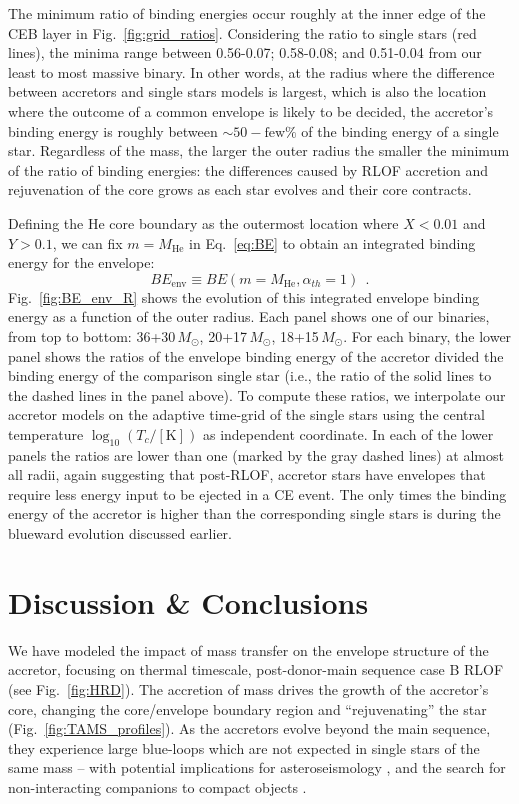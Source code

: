 \documentclass[twocolumn,twocolappendix,trackchanges]{aastex63}
\DeclareRobustCommand{\Eqref}[1]{Eq.~\ref{#1}}
\DeclareRobustCommand{\Figref}[1]{Fig.~\ref{#1}}
\begin{document}
The minimum ratio of binding energies occur roughly at the inner edge
of the CEB layer in \Figref{fig:grid_ratios}. Considering the
ratio to single stars (red lines), the minima range between 0.56-0.07;
0.58-0.08; and 0.51-0.04 from our least to most massive binary. In
other words, at the radius where the difference between accretors and
single stars models is largest, which is also the location where the
outcome of a common envelope is likely to be decided, the accretor's
binding energy is roughly between $\sim{}50-\mathrm{few}\%$ of the
binding energy of a single star. Regardless of the mass, the larger
the outer radius the smaller the minimum of the ratio of binding
energies: the differences caused by RLOF accretion and rejuvenation of
the core grows as each star evolves and their core contracts.


Defining the He core boundary as the outermost location where $X<0.01$
and $Y>0.1$, we can fix $m=M_\mathrm{He}$ in \Eqref{eq:BE} to obtain
an integrated binding energy for the envelope:
\begin{equation}
  \label{eq:BE_env}
  BE_\mathrm{env} \equiv BE(m=M_\mathrm{He}, \alpha_{th}=1) \ \ .
\end{equation}
\Figref{fig:BE_env_R} shows the evolution of this integrated envelope
binding energy as a function of the outer radius. Each panel shows one
of our binaries, from top to bottom: 36+30\,$M_\odot$,
20+17\,$M_\odot$, 18+15\,$M_\odot$.  For each binary, the
lower panel shows the ratios of the envelope binding energy of the
accretor divided the binding energy of the comparison single star
(i.e., the ratio of the solid lines to the dashed lines in the panel
above). To compute these ratios, we interpolate our accretor models
on the adaptive time-grid of the single stars using the central temperature
$\log_{10}(T_c/[\mathrm{K}])$ as independent coordinate. In each of
the lower panels the ratios are lower than one (marked by the gray
dashed lines) at almost all radii, again suggesting that post-RLOF,
accretor stars have envelopes that require less energy input to be
ejected in a CE event. The only times the binding energy of the
accretor is higher than the corresponding single stars is during the
blueward evolution discussed earlier.

\section{Discussion \& Conclusions}
\label{sec:conclusions}

We have modeled the impact of mass transfer on the envelope structure
of the accretor, focusing on thermal timescale, post-donor-main
sequence case B RLOF (see \Figref{fig:HRD}). The accretion of mass
drives the growth of the accretor's core, changing the core/envelope
boundary region and ``rejuvenating'' the star (\Figref{fig:TAMS_profiles}). As the accretors evolve
beyond the main sequence, they experience large blue-loops which are
not expected in single stars of the same mass -- with potential
implications for asteroseismology \citep[e.g.,][]{dorn-wallenstein:20},
and the search for non-interacting companions to compact objects
\citep[e.g.,][]{breivik:17, andrews:19, chawla:21}.
\end{document}
